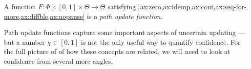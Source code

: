 \begin{defn}
	A function $F: \Phi \times [0,1] \times \Theta \to \Theta$ 
	satisfying
	\cref{ax:zero,ax:idemp,ax:cont,ax:seq-for-more,ax:diffble,ax:nopause}
	is 
	a \emph{path update function}.
\end{defn}



Path update functions capture some important aspects of uncertain
updating%
---but a number $\chi \in [0,1]$ is not the only useful
way to quantify confidence.
For the full picture of of how these concepts are related, we will
need to look at confidence from several more angles.




